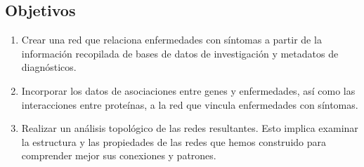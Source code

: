 \subsection{Objetivos}
\begin{enumerate}
    \item Crear una red que relaciona enfermedades con síntomas a partir de la información recopilada de bases de datos de investigación y metadatos de diagnósticos.
    
    \item Incorporar los datos de asociaciones entre genes y enfermedades, así como las interacciones entre proteínas, a la red que vincula enfermedades con síntomas.
    \item Realizar un análisis topológico de las redes resultantes. Esto implica examinar la estructura y las propiedades de las redes que hemos construido para comprender mejor sus conexiones y patrones.

\end{enumerate}
